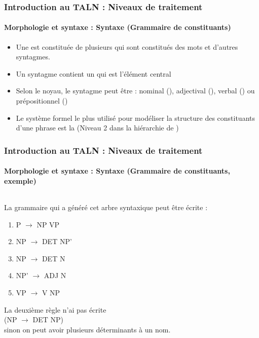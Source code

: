 \documentclass[xcolor=table]{beamer}
\begin{document}
\begin{frame}
\frametitle{Introduction au TALN : Niveaux de traitement}
\framesubtitle{Morphologie et syntaxe : Syntaxe (Grammaire de constituants)}

\begin{itemize}
	\item Une  est constituée de plusieurs  qui sont constitués des mots et d'autres syntagmes.
	\item Un syntagme contient un  qui est l'élément central 
	\item Selon le noyau, le syntagme peut être : nominal (), adjectival (), verbal () ou prépositionnel ()
	\item Le système formel le plus utilisé pour modéliser la structure des constituants d'une phrase est la  (Niveau 2 dans la hiérarchie de )
\end{itemize}


\end{frame}


\begin{frame}
\frametitle{Introduction au TALN : Niveaux de traitement}
\framesubtitle{Morphologie et syntaxe : Syntaxe (Grammaire de constituants, exemple)}

\begin{columns}
	\begin{column}{0.52\textwidth}
	La grammaire qui a généré cet arbre syntaxique peut être écrite : 
	
	\begin{enumerate}
		\item P $ \rightarrow $ NP VP
		\item NP $ \rightarrow $ DET NP'
		\item NP $ \rightarrow $ DET N
		\item NP' $ \rightarrow $ ADJ N
		\item VP $ \rightarrow $ V NP
	\end{enumerate}

	La deuxième règle n'ai pas écrite \\(NP $ \rightarrow $ DET NP)\\ sinon on peut avoir plusieurs déterminants à un nom.
	
	\end{column}
	\begin{column}{0.42\textwidth}
	\end{column}%
\end{columns}


\end{frame}
\end{document}

